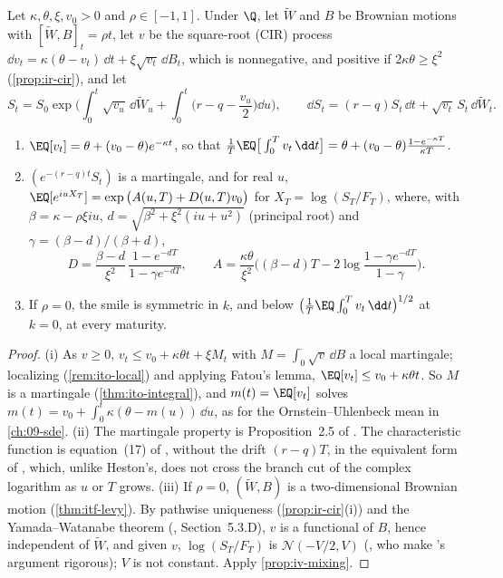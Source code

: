 \begin{proposition}\label{prop:iv-heston}
Let $\kappa,\theta,\xi,v_0>0$ and $\rho\in[-1,1]$. Under $\Q$, let $\widetilde W$ and $B$ be Brownian
motions with $[\widetilde W,B]_t=\rho t$, let $v$ be the square-root (CIR) process
$\dd v_t=\kappa(\theta-v_t)\,\dd t+\xi\sqrt{v_t}\,\dd B_t$, which is nonnegative, and positive if
$2\kappa\theta\ge\xi^2$ (\cref{prop:ir-cir}), and let
\[
  S_t=S_0\exp\Big(\int_0^t\sqrt{v_u}\,\dd\widetilde W_u+\int_0^t\Big(r-q-\frac{v_u}2\Big)\dd u\Big),
  \qquad\dd S_t=(r-q)S_t\,\dd t+\sqrt{v_t}\,S_t\,\dd\widetilde W_t .
\]
\begin{enumerate}[label=(\roman*)]
  \item $\EQ[v_t]=\theta+(v_0-\theta)e^{-\kappa t}$, so that
    $\frac1T\EQ\big[\int_0^Tv_t\,\dd t\big]=\theta+(v_0-\theta)\frac{1-e^{-\kappa T}}{\kappa T}$.
  \item $(e^{-(r-q)t}S_t)$ is a martingale, and for real $u$, $\EQ[e^{iuX_T}]=\exp\big(A(u,T)+D(u,T)v_0\big)$
    for $X_T=\log(S_T/F_T)$, where, with $\beta=\kappa-\rho\xi iu$, $d=\sqrt{\beta^2+\xi^2(iu+u^2)}$ (principal
    root) and $\gamma=(\beta-d)/(\beta+d)$,
    \begin{equation}\label{eq:iv-heston-cf}
      D=\frac{\beta-d}{\xi^2}\,\frac{1-e^{-dT}}{1-\gamma e^{-dT}},\qquad
      A=\frac{\kappa\theta}{\xi^2}\Big((\beta-d)T-2\log\frac{1-\gamma e^{-dT}}{1-\gamma}\Big).
    \end{equation}
  \item If $\rho=0$, the smile is symmetric in $k$, and below
    $\big(\frac1T\EQ\int_0^Tv_t\,\dd t\big)^{1/2}$ at $k=0$, at every maturity.
\end{enumerate}
\end{proposition}

\begin{proof}
(i) As $v\ge0$, $v_t\le v_0+\kappa\theta t+\xi M_t$ with $M=\int_0^\cdot\sqrt v\,\dd B$ a local martingale;
localizing (\cref{rem:ito-local}) and applying Fatou's lemma, $\EQ[v_t]\le v_0+\kappa\theta t$. So $M$ is a
martingale (\cref{thm:ito-integral}), and $m(t)=\EQ[v_t]$ solves $m(t)=v_0+\int_0^t\kappa(\theta-m(u))\,\dd u$,
as for the Ornstein--Uhlenbeck mean in \cref{ch:09-sde}. (ii) The martingale property is Proposition~2.5
of \textcite{andersen-piterbarg-2007}. The characteristic function is equation~(17) of
\textcite{heston-closed-form}, without the drift $(r-q)T$, in the equivalent form of
\textcite{albrecher-heston-trap}, which, unlike Heston's, does not cross the branch cut of the complex
logarithm as $u$ or $T$ grows. (iii) If $\rho=0$, $(\widetilde W,B)$ is a two-dimensional Brownian motion
(\cref{thm:itf-levy}). By pathwise uniqueness (\cref{prop:ir-cir}(i)) and the Yamada--Watanabe theorem
(\textcite{karatzas-shreve}, Section~5.3.D), $v$ is a functional of $B$, hence independent of $\widetilde W$,
and given $v$, $\log(S_T/F_T)$ is $\mathcal N(-V/2,V)$ (\textcite{romano-touzi-1997}, who make
\textcite{hull-white-1987}'s argument rigorous); $V$ is not constant. Apply \cref{prop:iv-mixing}.
\end{proof}

